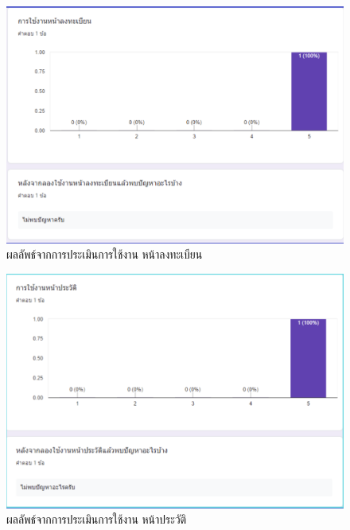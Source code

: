 \begin{figure}
  \begin{center}
    \includegraphics[width=\linewidth]{images/eval1.png}
  \end{center}
  \caption[ผลลัพธ์จากการประเมินการใช้งาน หน้าลงทะเบียน]{ผลลัพธ์จากการประเมินการใช้งาน หน้าลงทะเบียน}
  \label{fig:Eval1}
\end{figure}

\begin{figure}
  \begin{center}
    \includegraphics[width=\linewidth]{images/eval2.png}
  \end{center}
  \caption[ผลลัพธ์จากการประเมินการใช้งาน หน้าประวัติ]{ผลลัพธ์จากการประเมินการใช้งาน หน้าประวัติ}
  \label{fig:Eval2}
\end{figure}

